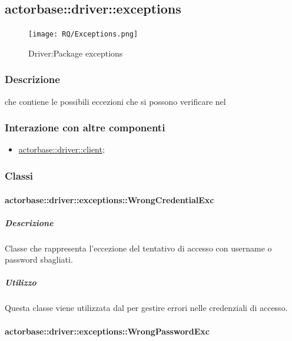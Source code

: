 \documentclass{scalatekids-article}
\begin{document}

\subsection{actorbase::driver::exceptions}
\label{sec:actorbase::driver::exceptions}

\begin{figure}[H]
  \begin{center}
    \texttt{[image: RQ/Exceptions.png]}
    \caption{Driver:Package exceptions}
  \end{center}
\end{figure}

\subsubsection{Descrizione}

 che contiene le possibili eccezioni che si possono verificare nel 

\subsubsection{Interazione con altre componenti}
\begin{itemize}
\item \hyperref[sec:actorbase::driver::client]{actorbase::driver::client};
\end{itemize}

\subsubsection{Classi}

\paragraph{actorbase::driver::exceptions::WrongCredentialExc}

\subparagraph{Descrizione}

Classe che rappresenta l'eccezione del tentativo di accesso con username o password sbagliati.

\subparagraph{Utilizzo}

Questa classe viene utilizzata dal  per gestire errori nelle credenziali di accesso.


\paragraph{actorbase::driver::exceptions::WrongPasswordExc}
\end{document}
